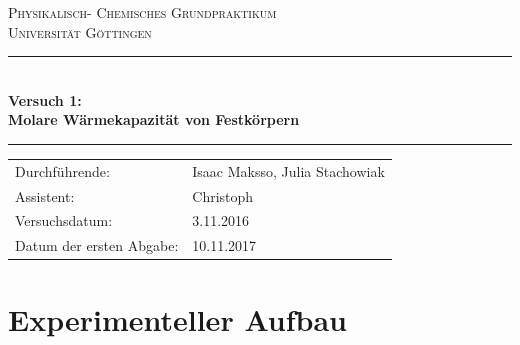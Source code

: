\documentclass[12pt,a4paper,titlepage,headinclude,bibtotoc]{scrartcl}
\begin{document}
\begin{titlepage}
\centering
\textsc{\Large Physikalisch- Chemisches Grundpraktikum\\[1.5ex] Universität Göttingen}

\vspace*{0.5cm}

\rule{\textwidth}{1pt}\\[0.5cm]
{\huge \bfseries
  Versuch 1: \\[1.5ex]
  Molare Wärmekapazität von Festkörpern }\\[0.5cm]
\rule{\textwidth}{1pt}

\vspace*{0.5cm}


\begin{Large}
\begin{tabular}{ll}
Durchführende: &  Isaac Maksso, Julia Stachowiak\\
Assistent: & Christoph \\
 Versuchsdatum: & 3.11.2016\\
 Datum der ersten Abgabe: & 10.11.2017\\
\end{tabular}
\end{Large}

\vspace*{0.5cm}

\begin{Large}
\end{Large}
\end{titlepage}


\tableofcontents

\newpage


\section{Experimenteller Aufbau}
\end{document}

